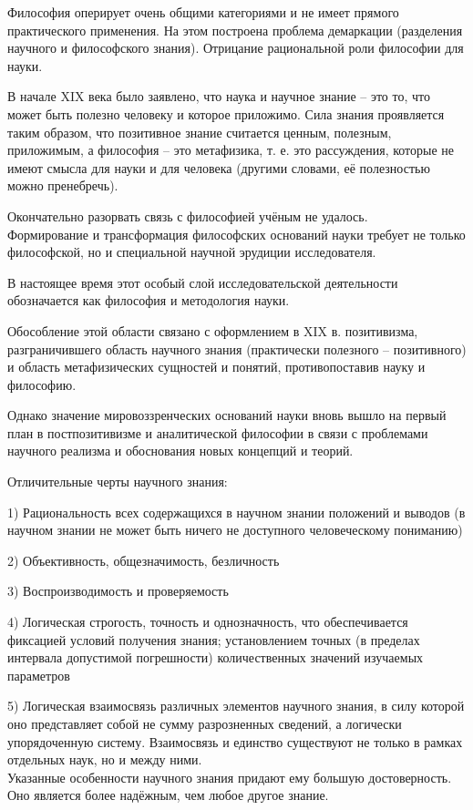 \documentclass[exam_answers.tex]{subfiles}
\begin{document}
\renewcommand{\baselinestretch}{\blch}

Философия оперирует очень общими категориями и не имеет прямого практического применения.
На этом построена проблема демаркации (разделения научного и философского знания).
Отрицание рациональной роли философии для науки.

В начале XIX века было заявлено, что наука и научное знание – это то, что может быть полезно человеку и которое приложимо.
Сила знания проявляется таким образом, что позитивное знание считается ценным, полезным, приложимым, а философия – это метафизика, т. е. это рассуждения, которые не имеют смысла для науки и для человека (другими словами, её полезностью можно пренебречь).

Окончательно разорвать связь с философией учёным не удалось.
\\

Формирование и трансформация философских оснований науки требует не только философской, но и специальной научной эрудиции исследователя.

В настоящее время этот особый слой исследовательской деятельности обозначается как философия и методология науки.

Обособление этой области связано с оформлением в XIX в. позитивизма, разграничившего область научного знания (практически полезного – позитивного) и область метафизических сущностей и понятий, противопоставив науку и философию.

Однако значение мировоззренческих оснований науки вновь вышло на первый план в постпозитивизме и аналитической философии в связи с проблемами научного реализма и обоснования новых концепций и теорий.

Отличительные черты научного знания:

1) Рациональность всех содержащихся в научном знании положений и выводов (в научном знании не может быть ничего не доступного человеческому пониманию)

2) Объективность, общезначимость, безличность

3) Воспроизводимость и проверяемость

4) Логическая строгость, точность и однозначность, что обеспечивается фиксацией условий получения знания; установлением точных (в пределах интервала допустимой погрешности) количественных значений изучаемых параметров

5) Логическая взаимосвязь различных элементов научного знания, в силу которой оно представляет собой не сумму разрозненных сведений, а логически упорядоченную систему.
Взаимосвязь и единство существуют не только в рамках отдельных наук, но и между ними.
\\

Указанные особенности научного знания придают ему большую достоверность.
Оно является более надёжным, чем любое другое знание.
\end{document}
